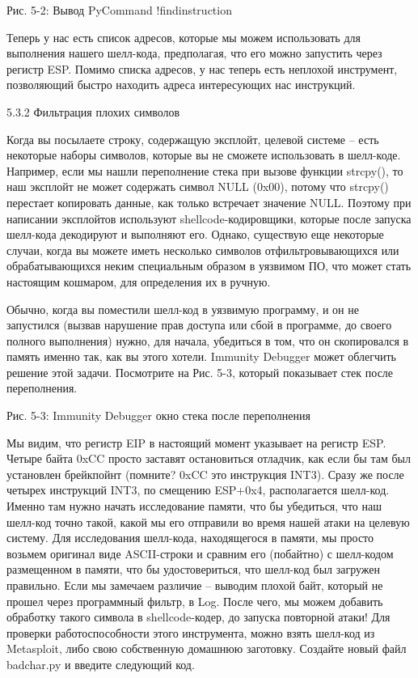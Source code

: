 \documentclass[12pt, a4paper, oneside]{book}
\begin{document}
 
Рис. 5-2: Вывод PyCommand !findinstruction

Теперь у нас есть список адресов, которые мы можем использовать для выполнения нашего шелл-кода, предполагая, что его можно запустить через регистр ESP. Помимо списка адресов, у нас теперь есть неплохой инструмент, позволяющий быстро находить адреса интересующих нас инструкций.

5.3.2 Фильтрация плохих символов

Когда вы посылаете строку, содержащую эксплойт, целевой системе – есть некоторые наборы символов, которые вы не сможете использовать в шелл-коде. Например, если мы нашли переполнение стека при вызове функции strcpy(), то наш эксплойт не может содержать символ NULL (0x00), потому что strcpy() перестает копировать данные, как только встречает значение NULL. Поэтому при написании эксплойтов используют shellcode-кодировщики, которые после запуска шелл-кода декодируют и выполняют его. Однако, существую еще некоторые случаи, когда вы можете иметь несколько символов отфильтровывающихся или обрабатывающихся неким специальным образом в уязвимом ПО, что может стать настоящим кошмаром, для определения их в ручную.

Обычно, когда вы поместили шелл-код в уязвимую программу, и он не запустился (вызвав нарушение прав доступа или сбой в программе, до своего полного выполнения) нужно, для начала, убедиться в том, что он скопировался в память именно так, как вы этого хотели. Immunity Debugger может облегчить решение этой задачи. Посмотрите на Рис. 5-3, который показывает стек после переполнения.


Рис. 5-3: Immunity Debugger окно стека после переполнения

Мы видим, что регистр EIP в настоящий момент указывает на регистр ESP. Четыре байта 0xCC просто заставят остановиться отладчик, как если бы там был установлен брейкпойнт (помните? 0xCC это инструкция INT3). Сразу же после четырех инструкций INT3, по смещению ESP+0x4, располагается шелл-код. Именно там нужно начать исследование памяти, что бы убедиться, что наш шелл-код точно такой, какой мы его отправили во время нашей атаки на целевую систему. Для исследования шелл-кода, находящегося в памяти, мы просто возьмем оригинал виде ASCII-строки и сравним его (побайтно) с шелл-кодом размещенном в памяти, что бы удостовериться, что шелл-код был загружен правильно. Если мы замечаем различие – выводим плохой байт, который не прошел через программный фильтр, в Log. После чего, мы можем добавить обработку такого символа в shellcode-кодер, до запуска повторной атаки! Для проверки работоспособности этого инструмента, можно взять шелл-код из Metasploit, либо свою собственную домашнюю заготовку. Создайте новый файл badchar.py и введите следующий код.
\end{document}
